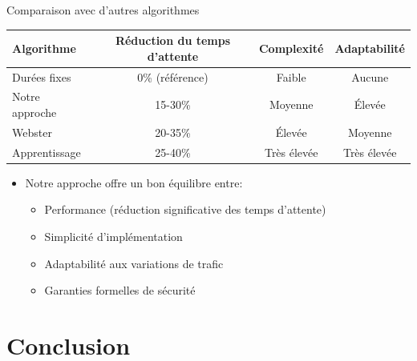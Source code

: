 \begin{frame}{Comparaison avec d'autres algorithmes}
  \begin{table}
    \begin{tabular}{|l|c|c|c|}
      \hline
      \textbf{Algorithme} & \textbf{Réduction du temps d'attente} & \textbf{Complexité} & \textbf{Adaptabilité} \\
      \hline
      Durées fixes & 0\% (référence) & Faible & Aucune \\
      \hline
      Notre approche & 15-30\% & Moyenne & Élevée \\
      \hline
      Webster & 20-35\% & Élevée & Moyenne \\
      \hline
      Apprentissage & 25-40\% & Très élevée & Très élevée \\
      \hline
    \end{tabular}
  \end{table}
  
  \begin{itemize}
    \item<2-> Notre approche offre un bon équilibre entre:
    \begin{itemize}
      \item Performance (réduction significative des temps d'attente)
      \item Simplicité d'implémentation
      \item Adaptabilité aux variations de trafic
      \item Garanties formelles de sécurité
    \end{itemize}
  \end{itemize}
\end{frame}

\section{Conclusion}

